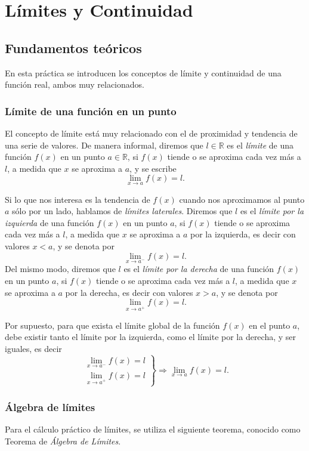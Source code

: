 \chapter{Límites y Continuidad}

\section{Fundamentos teóricos}
En esta práctica se introducen los conceptos de límite y continuidad de una función real, ambos muy relacionados.

\subsection{Límite de una función en un punto}
El concepto de límite está muy relacionado con el de proximidad y tendencia de una serie de valores. De manera informal, diremos que $l\in \mathbb{R}$ es el \emph{límite} de una función $f(x)$ en un punto $a\in \mathbb{R}$, si $f(x)$ tiende o se aproxima cada vez más a $l$, a medida que $x$ se aproxima a $a$, y se escribe
\[ \lim_{x\rightarrow a} f(x)=l.\]

Si lo que nos interesa es la tendencia de $f(x)$ cuando nos aproximamos al punto $a$ sólo por un lado, hablamos de \emph{límites laterales}. Diremos que $l$ es el \emph{límite por la izquierda} de una función $f(x)$ en un punto $a$, si $f(x)$ tiende o se aproxima cada vez más a $l$, a medida que $x$ se aproxima a $a$ por la izquierda, es decir con valores $x<a$, y se denota por
\[ \lim_{x\rightarrow a^-} f(x)=l.\]
Del mismo modo, diremos que $l$ es el \emph{límite por la derecha} de una función $f(x)$ en un punto $a$, si $f(x)$ tiende o se aproxima cada vez más a $l$, a medida que $x$ se aproxima a $a$ por la derecha, es decir con valores $x>a$, y se denota por
\[ \lim_{x\rightarrow a^+} f(x)=l.\]

Por supuesto, para que exista el límite global de la función $f(x)$ en el punto $a$, debe existir tanto el límite por la izquierda, como el límite por la derecha, y ser iguales, es decir
\[
\left.
\begin{array}{l}
\displaystyle \lim_{x\rightarrow a^-} f(x)=l\\
\displaystyle \lim_{x\rightarrow a^+} f(x)=l
\end{array}
\right\}
\Longrightarrow
\lim_{x\rightarrow a} f(x)=l.
\]

\subsection{Álgebra de límites}
Para el cálculo práctico de límites, se utiliza el siguiente
teorema, conocido como Teorema de \emph{Álgebra de Límites}.

